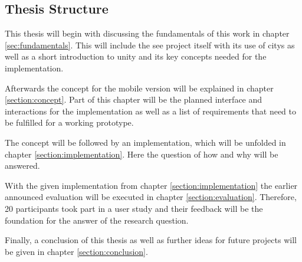 \subsection{Thesis Structure}
This thesis will begin with discussing the fundamentals of this work in chapter \ref{sec:fundamentals}.
This will include the \gls{see} project itself with its use of \glspl{city} as well as a short introduction to \gls{unity} and its key concepts needed for the implementation.

Afterwards the concept for the mobile version will be explained in chapter \ref{section:concept}.
Part of this chapter will be the planned interface and interactions for the implementation as well as a list of requirements that need to be fulfilled for a working prototype.

The concept will be followed by an implementation, which will be unfolded in chapter \ref{section:implementation}.
Here the question of how and why will be answered. 

With the given implementation from chapter \ref{section:implementation} the earlier announced evaluation will be executed in chapter \ref{section:evaluation}.
Therefore, 20 participants took part in a user study and their feedback will be the foundation for the answer of the research question.

Finally, a conclusion of this thesis as well as further ideas for future projects will be given in chapter \ref{section:conclusion}.